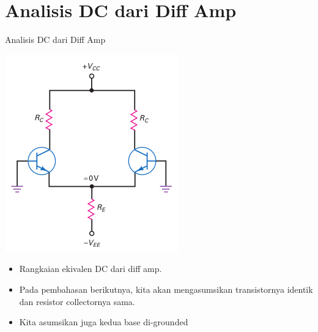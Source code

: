 \documentclass[aspectratio=169]{beamer}
\begin{document}
\section{Analisis DC dari Diff Amp}
\begin{frame}{Analisis DC dari Diff Amp}
	\begin{multicols}{2}
		\begin{center}
			\includegraphics[width=0.7\textheight]{gambar/01.diff-amp/01.ideal_dc_analysis}
		\end{center}
		\columnbreak
		\begin{itemize}
			\item Rangkaian ekivalen DC dari diff amp.
			\item Pada pembahasan berikutnya, kita akan mengasumsikan transistornya identik dan resistor collectornya sama.
			\item Kita asumsikan juga kedua base di-grounded
		\end{itemize}
	\end{multicols}
\end{frame}
\end{document}
